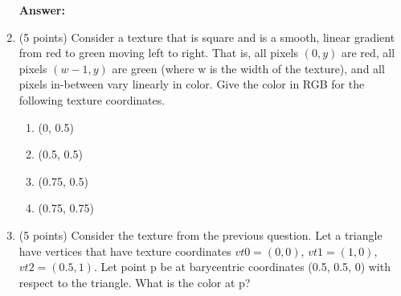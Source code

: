 \documentclass[12pt]{letter}
\begin{document}
\begin{enumerate}
	\textbf{Answer:} \\
	
	\item (5 points)
	Consider a texture that is square and is a smooth, linear gradient from red to green moving left to right.
	That is, all pixels $(0, y)$ are red, all pixels $(w − 1, y)$ are green (where w is the width of
the texture), and all pixels in-between vary linearly in color. Give the color in RGB for the following
texture coordinates.
	\begin{enumerate}
		\item (0, 0.5)
		\item (0.5, 0.5)
		\item (0.75, 0.5)
		\item (0.75, 0.75)
	\end{enumerate}

	\item (5 points)
	Consider the texture from the previous question. Let a triangle have vertices that have texture coordinates $vt0 = (0, 0)$, $vt1 = (1, 0)$, $vt2 = (0.5, 1)$. 
	Let point p be at barycentric coordinates (0.5, 0.5, 0) with respect to the triangle.
	What is the color at p?
\end{enumerate}
\end{document}

